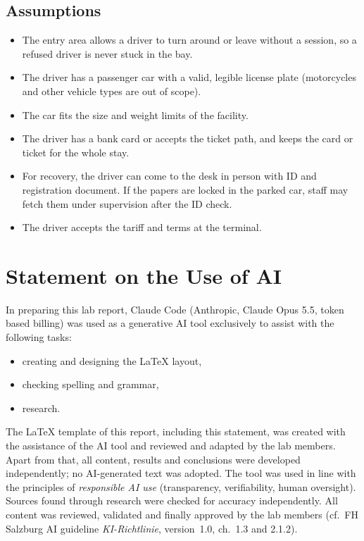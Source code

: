 \documentclass[11pt,a4paper]{article}
\newcommand{\aitool}{Claude Code (Anthropic, Claude Opus 5.5, token based billing)}
\begin{document}
\subsection*{Assumptions}

\begin{itemize}
    \item The entry area allows a driver to turn around or leave without a
    session, so a refused driver is never stuck in the bay.
    \item The driver has a passenger car with a valid, legible license plate
    (motorcycles and other vehicle types are out of scope).
    \item The car fits the size and weight limits of the facility.
    \item The driver has a bank card or accepts the ticket path, and keeps the
    card or ticket for the whole stay.
    \item For recovery, the driver can come to the desk in person with ID and
    registration document. If the papers are locked in the parked car,
    staff may fetch them under supervision after the ID check.
    \item The driver accepts the tariff and terms at the terminal.
\end{itemize}

\clearpage
\section*{Statement on the Use of AI}

In preparing this lab report, \aitool{} was used as a generative AI tool
exclusively to assist with the following tasks:

\begin{itemize}
    \item creating and designing the \LaTeX{} layout,
    \item checking spelling and grammar,
    \item research.
\end{itemize}

The \LaTeX{} template of this report, including this statement, was created
with the assistance of the AI tool and reviewed and adapted by the lab members.
Apart from that, all content, results and conclusions were developed
independently; no AI-generated text was adopted. The tool was used in line with
the principles of \emph{responsible AI use} (transparency, verifiability, human
oversight). Sources found through research were checked for accuracy
independently. All content was reviewed, validated and finally approved by the
lab members (cf.\ FH Salzburg AI guideline \emph{KI-Richtlinie}, version~1.0,
ch.~1.3 and 2.1.2).

\label{LastPage}
\end{document}
